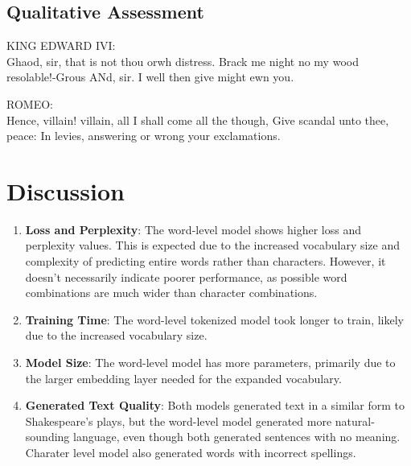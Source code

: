 \documentclass[fontsize=10pt]{article}
\begin{document}
\subsection{Qualitative Assessment}
\vspace{-10pt}
\begin{multicols}{2}

  
  \begin{tcolorbox}[title=Character-Level (ReLU) generated text:]
  \ttfamily %
  KING EDWARD IVI:\\
Ghaod, sir, that is not thou orwh distress.
Brack me night no my wood resolable!-Grous
ANd, sir. I well then give might ewn you.
  \end{tcolorbox}
  
  \columnbreak
  
  \begin{tcolorbox}[title=Word-Level (GeLU) generated text:]
  \ttfamily %
  ROMEO: \\
  Hence, villain! villain, all I shall come all the though, 
  Give scandal unto thee, peace: 
  In levies, answering or wrong your exclamations.  
  \end{tcolorbox}
  
  \end{multicols}
  \vspace{-25pt}
\section{Discussion}
\vspace{-10pt}
\begin{enumerate}
    \item \textbf{Loss and Perplexity}: The word-level model shows higher loss and perplexity values. This is expected due to the increased vocabulary size and complexity of predicting entire words rather than characters. However, it doesn't necessarily indicate poorer performance, as possible word combinations are much wider than character combinations.

    \item \textbf{Training Time}: The word-level tokenized model took longer to train, likely due to the increased vocabulary size.

    \item \textbf{Model Size}: The word-level model has more parameters, primarily due to the larger embedding layer needed for the expanded vocabulary.

    \item \textbf{Generated Text Quality}: Both models generated text in a similar form to Shakespeare's plays, but the word-level model generated more natural-sounding language, even though both generated sentences with no meaning. Charater level model also generated words with incorrect spellings.
\end{enumerate}
\vspace{-10pt}
\end{document}
